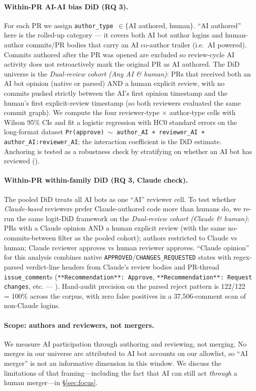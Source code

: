 \paragraph{Within-PR AI-AI bias DiD (RQ 3).} For each PR we assign \texttt{author\_type}~$\in\{$AI authored, human$\}$. ``AI authored'' here is the rolled-up category --- it covers both AI bot author logins and human-author commits/PR bodies that carry an AI co-author trailer (i.e.\ AI powered). Commits authored after the PR was opened are excluded so review-cycle AI activity does not retroactively mark the original PR as AI authored. The DiD universe is the \emph{Dual-review cohort (Any AI \& human)}: PRs that received both an AI bot opinion (native or parsed) AND a human explicit review, with no commits pushed strictly between the AI's first opinion timestamp and the human's first explicit-review timestamp (so both reviewers evaluated the same commit graph). We compute the four reviewer-type $\times$ author-type cells with Wilson 95\% CIs and fit a logistic regression with HC0 standard errors on the long-format dataset \texttt{Pr(approve) $\sim$ author\_AI + reviewer\_AI + author\_AI:reviewer\_AI}; the interaction coefficient is the DiD estimate. Anchoring is tested as a robustness check by stratifying on whether an AI bot has reviewed ().

\paragraph{Within-PR within-family DiD (RQ 3, Claude check).} The pooled DiD treats all AI bots as one ``AI'' reviewer cell. To test whether \emph{Claude-based} reviewers prefer Claude-authored code more than humans do, we re-run the same logit-DiD framework on the \emph{Dual-review cohort (Claude \& human)}: PRs with a Claude opinion AND a human explicit review (with the same no-commits-between filter as the pooled cohort); authors restricted to Claude vs human; Claude reviewer approves vs human reviewer approves. ``Claude opinion'' for this analysis combines native \texttt{APPROVED}/\texttt{CHANGES\_REQUESTED} states with regex-parsed verdict-line headers from Claude's review bodies and PR-thread \texttt{issue\_comment}s (\texttt{**Recommendation**: Approve}, \texttt{**Recommendation**: Request changes}, etc. --- ). Hand-audit precision on the parsed reject pattern is 122/122 = 100\% across the corpus, with zero false positives in a 37,506-comment scan of non-Claude logins.

\paragraph{Scope: authors and reviewers, not mergers.} We measure AI participation through authoring and reviewing, not merging. No merges in our universe are attributed to AI bot accounts on our allowlist, so ``AI merger'' is not an informative dimension in this window. We discuss the limitations of that framing---including the fact that AI can still act \emph{through} a human merger---in §\ref{sec:focus}.
